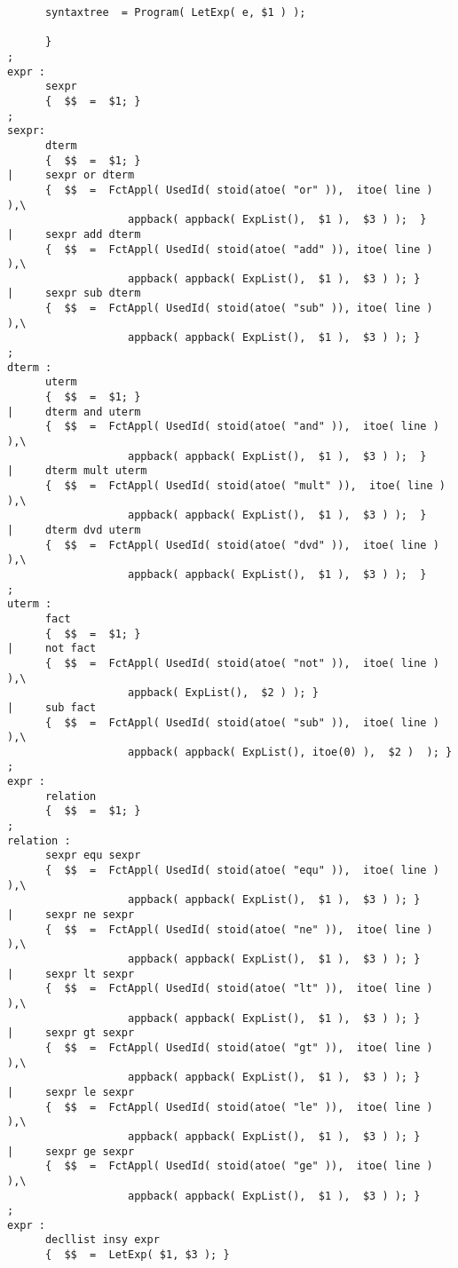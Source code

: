 \begin{verbatim}
      syntaxtree  = Program( LetExp( e, $1 ) );

      } 
;
expr :
      sexpr
      {  $$  =  $1; }
;
sexpr:
      dterm
      {  $$  =  $1; }
|     sexpr or dterm
      {  $$  =  FctAppl( UsedId( stoid(atoe( "or" )),  itoe( line ) ),\
                   appback( appback( ExpList(),  $1 ),  $3 ) );  }
|     sexpr add dterm
      {  $$  =  FctAppl( UsedId( stoid(atoe( "add" )), itoe( line ) ),\
                   appback( appback( ExpList(),  $1 ),  $3 ) ); } 
|     sexpr sub dterm
      {  $$  =  FctAppl( UsedId( stoid(atoe( "sub" )), itoe( line ) ),\
                   appback( appback( ExpList(),  $1 ),  $3 ) ); } 
;
dterm :
      uterm
      {  $$  =  $1; }
|     dterm and uterm
      {  $$  =  FctAppl( UsedId( stoid(atoe( "and" )),  itoe( line ) ),\
                   appback( appback( ExpList(),  $1 ),  $3 ) );  }
|     dterm mult uterm
      {  $$  =  FctAppl( UsedId( stoid(atoe( "mult" )),  itoe( line ) ),\
                   appback( appback( ExpList(),  $1 ),  $3 ) );  }
|     dterm dvd uterm
      {  $$  =  FctAppl( UsedId( stoid(atoe( "dvd" )),  itoe( line ) ),\
                   appback( appback( ExpList(),  $1 ),  $3 ) );  }
;
uterm :        
      fact
      {  $$  =  $1; }
|     not fact
      {  $$  =  FctAppl( UsedId( stoid(atoe( "not" )),  itoe( line ) ),\
                   appback( ExpList(),  $2 ) ); }
|     sub fact
      {  $$  =  FctAppl( UsedId( stoid(atoe( "sub" )),  itoe( line ) ),\
                   appback( appback( ExpList(), itoe(0) ),  $2 )  ); }
;
expr :
      relation
      {  $$  =  $1; }
;
relation :
      sexpr equ sexpr
      {  $$  =  FctAppl( UsedId( stoid(atoe( "equ" )),  itoe( line ) ),\
                   appback( appback( ExpList(),  $1 ),  $3 ) ); }
|     sexpr ne sexpr
      {  $$  =  FctAppl( UsedId( stoid(atoe( "ne" )),  itoe( line ) ),\
                   appback( appback( ExpList(),  $1 ),  $3 ) ); }
|     sexpr lt sexpr
      {  $$  =  FctAppl( UsedId( stoid(atoe( "lt" )),  itoe( line ) ),\
                   appback( appback( ExpList(),  $1 ),  $3 ) ); }
|     sexpr gt sexpr
      {  $$  =  FctAppl( UsedId( stoid(atoe( "gt" )),  itoe( line ) ),\
                   appback( appback( ExpList(),  $1 ),  $3 ) ); }
|     sexpr le sexpr
      {  $$  =  FctAppl( UsedId( stoid(atoe( "le" )),  itoe( line ) ),\
                   appback( appback( ExpList(),  $1 ),  $3 ) ); }
|     sexpr ge sexpr
      {  $$  =  FctAppl( UsedId( stoid(atoe( "ge" )),  itoe( line ) ),\
                   appback( appback( ExpList(),  $1 ),  $3 ) ); }
;
expr :
      decllist insy expr
      {  $$  =  LetExp( $1, $3 ); }

\end{verbatim}
